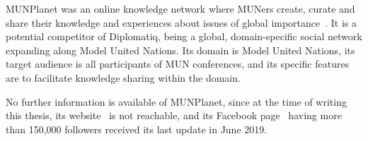MUNPlanet was an online knowledge network where MUNers create, curate and share their knowledge and experiences about issues of global importance~\cite{munplanetfacebook}. It is a potential competitor of Diplomatiq, being a global, domain-specific social network expanding along Model United Nations. Its domain is Model United Nations, its target audience is all participants of MUN conferences, and its specific features are to facilitate knowledge sharing within the domain.

No further information is available of MUNPlanet, since at the time of writing this thesis, its website~\cite{munplanetwebsite} is not reachable, and its Facebook page~\cite{munplanetfacebook} having more than 150,000 followers received its last update in June 2019.
